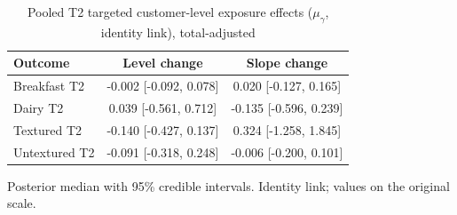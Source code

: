 \begin{table}[H]
\centering
\caption{Pooled T2 targeted customer-level exposure effects ($\mu_\gamma$, identity link), total-adjusted}
\label{tab:a6_t2_mu_gamma_adj}
\begin{tabular}{lcc}
\toprule
Outcome & Level change & Slope change \\
\midrule
Breakfast T2 & -0.002 [-0.092, 0.078] & 0.020 [-0.127, 0.165] \\
Dairy T2 & 0.039 [-0.561, 0.712] & -0.135 [-0.596, 0.239] \\
Textured T2 & -0.140 [-0.427, 0.137] & 0.324 [-1.258, 1.845] \\
Untextured T2 & -0.091 [-0.318, 0.248] & -0.006 [-0.200, 0.101] \\
\bottomrule
\end{tabular}
\par\smallskip\footnotesize Posterior median with 95\% credible intervals. Identity link; values on the original scale.
\end{table}
